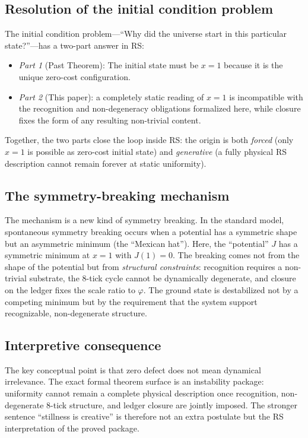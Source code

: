 \documentclass[11pt,a4paper]{article}
\newcommand{\Jcost}{J}
\newcommand{\phirs}{\varphi}
\begin{document}
\subsection{Resolution of the initial condition problem}

The initial condition problem---``Why did the universe start in this particular state?''---has a two-part answer in RS:
\begin{itemize}
\item \emph{Part 1} (Past Theorem): The initial state must be $x=1$ because it is the unique zero-cost configuration.
\item \emph{Part 2} (This paper): a completely static reading of $x=1$ is incompatible with the recognition and non-degeneracy obligations formalized here, while closure fixes the form of any resulting non-trivial content.
\end{itemize}
Together, the two parts close the loop inside RS: the origin is both \emph{forced} (only $x=1$ is possible as zero-cost initial state) and \emph{generative} (a fully physical RS description cannot remain forever at static uniformity).

\subsection{The symmetry-breaking mechanism}

The mechanism is a new kind of symmetry breaking.  In the standard model, spontaneous symmetry breaking occurs when a potential has a symmetric shape but an asymmetric minimum (the ``Mexican hat'').  Here, the ``potential'' $\Jcost$ has a symmetric minimum at $x=1$ with $\Jcost(1)=0$.  The breaking comes not from the shape of the potential but from \emph{structural constraints}: recognition requires a non-trivial substrate, the 8-tick cycle cannot be dynamically degenerate, and closure on the ledger fixes the scale ratio to $\phirs$.  The ground state is destabilized not by a competing minimum but by the requirement that the system support recognizable, non-degenerate structure.

\subsection{Interpretive consequence}

The key conceptual point is that zero defect does not mean dynamical irrelevance.  The exact formal theorem surface is an instability package: uniformity cannot remain a complete physical description once recognition, non-degenerate 8-tick structure, and ledger closure are jointly imposed.  The stronger sentence ``stillness is creative'' is therefore not an extra postulate but the RS interpretation of the proved package.
\end{document}
